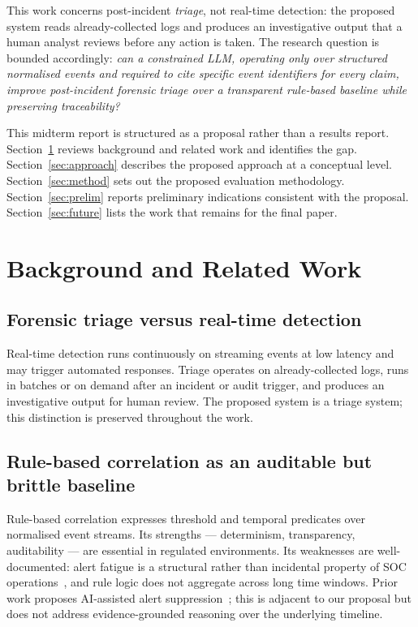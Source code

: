 \documentclass[conference]{IEEEtran}
\begin{document}
This work concerns post-incident \textit{triage}, not real-time detection: the proposed system reads already-collected logs and produces an investigative output that a human analyst reviews before any action is taken. The research question is bounded accordingly: \textit{can a constrained LLM, operating only over structured normalised events and required to cite specific event identifiers for every claim, improve post-incident forensic triage over a transparent rule-based baseline while preserving traceability?}

This midterm report is structured as a proposal rather than a results report. Section~\ref{sec:background} reviews background and related work and identifies the gap. Section~\ref{sec:approach} describes the proposed approach at a conceptual level. Section~\ref{sec:method} sets out the proposed evaluation methodology. Section~\ref{sec:prelim} reports preliminary indications consistent with the proposal. Section~\ref{sec:future} lists the work that remains for the final paper.

\section{Background and Related Work}
\label{sec:background}

\subsection{Forensic triage versus real-time detection}
Real-time detection runs continuously on streaming events at low latency and may trigger automated responses. Triage operates on already-collected logs, runs in batches or on demand after an incident or audit trigger, and produces an investigative output for human review. The proposed system is a triage system; this distinction is preserved throughout the work.

\subsection{Rule-based correlation as an auditable but brittle baseline}
Rule-based correlation expresses threshold and temporal predicates over normalised event streams. Its strengths --- determinism, transparency, auditability --- are essential in regulated environments. Its weaknesses are well-documented: alert fatigue is a structural rather than incidental property of SOC operations~\cite{ref1}, and rule logic does not aggregate across long time windows. Prior work proposes AI-assisted alert suppression~\cite{ref2}; this is adjacent to our proposal but does not address evidence-grounded reasoning over the underlying timeline.
\end{document}
